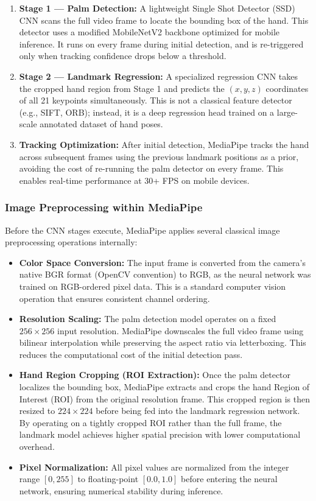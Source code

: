 \documentclass[11pt,a4paper]{article}
\begin{document}
\begin{enumerate}
    \item \textbf{Stage 1 --- Palm Detection:} A lightweight Single Shot Detector (SSD) CNN scans the full video frame to locate the bounding box of the hand. This detector uses a modified MobileNetV2 backbone optimized for mobile inference. It runs on every frame during initial detection, and is re-triggered only when tracking confidence drops below a threshold.
    \item \textbf{Stage 2 --- Landmark Regression:} A specialized regression CNN takes the cropped hand region from Stage 1 and predicts the $(x, y, z)$ coordinates of all 21 keypoints simultaneously. This is not a classical feature detector (e.g., SIFT, ORB); instead, it is a deep regression head trained on a large-scale annotated dataset of hand poses.
    \item \textbf{Tracking Optimization:} After initial detection, MediaPipe tracks the hand across subsequent frames using the previous landmark positions as a prior, avoiding the cost of re-running the palm detector on every frame. This enables real-time performance at 30+ FPS on mobile devices.
\end{enumerate}

\subsubsection{Image Preprocessing within MediaPipe}

Before the CNN stages execute, MediaPipe applies several classical image preprocessing operations internally:

\begin{itemize}
    \item \textbf{Color Space Conversion:} The input frame is converted from the camera's native BGR format (OpenCV convention) to RGB, as the neural network was trained on RGB-ordered pixel data. This is a standard computer vision operation that ensures consistent channel ordering.
    \item \textbf{Resolution Scaling:} The palm detection model operates on a fixed $256 \times 256$ input resolution. MediaPipe downscales the full video frame using bilinear interpolation while preserving the aspect ratio via letterboxing. This reduces the computational cost of the initial detection pass.
    \item \textbf{Hand Region Cropping (ROI Extraction):} Once the palm detector localizes the bounding box, MediaPipe extracts and crops the hand Region of Interest (ROI) from the original resolution frame. This cropped region is then resized to $224 \times 224$ before being fed into the landmark regression network. By operating on a tightly cropped ROI rather than the full frame, the landmark model achieves higher spatial precision with lower computational overhead.
    \item \textbf{Pixel Normalization:} All pixel values are normalized from the integer range $[0, 255]$ to floating-point $[0.0, 1.0]$ before entering the neural network, ensuring numerical stability during inference.
\end{itemize}
\end{document}
